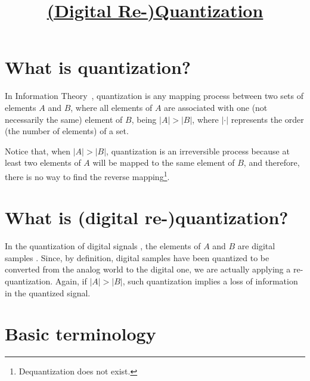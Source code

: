 



\title{\href{https://sistemas-multimedia.github.io/contents/quantization/}{(Digital Re-)Quantization}}

\maketitle

\tableofcontents

\section{What is quantization?}

In Information Theory~\cite{vruiz__information_theory}, quantization
\cite{vruiz__signal_quantization,vruiz__scalar_quantization,vruiz__vector_quantization,vruiz__trellis_quantization}
is any mapping process between two sets of elements $A$ and $B$, where
all elements of $A$ are associated with one (not necessarily the same)
element of $B$, being $|A|>|B|$, where $|\cdot|$ represents the order
(the number of elements) of a set.

Notice that, when $|A|>|B|$, quantization is an irreversible process
because at least two elements of $A$ will be mapped to the same
element of $B$, and therefore, there is no way to find the reverse
mapping\footnote{Dequantization does not exist.}.


\section{What is (digital re-)quantization?}

In the quantization of digital signals
\cite{vruiz__scalar_quantization,vruiz__vector_quantization}, the
elements of $A$ and $B$ are digital samples
\cite{vruiz__signal_quantization}. Since, by definition, digital
samples have been quantized to be converted from the analog world to
the digital one, we are actually applying a re-quantization. Again, if
$|A|>|B|$, such quantization implies a loss of information in the
quantized signal.


\section{Basic terminology}

